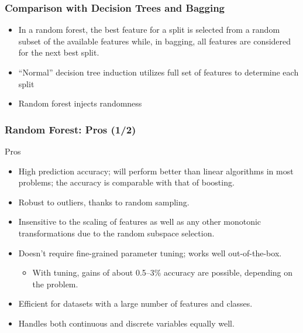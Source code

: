 



\begin{frame}[fragile]\frametitle{Comparison with Decision Trees and Bagging}
\begin{itemize}
\item In a random forest, the best feature for a split is selected from a random subset of the available features while, in bagging, all features are considered for the next best split.
\item ``Normal'' decision tree induction utilizes full set of features to determine each split
\item Random forest injects randomness
\end{itemize}
\end{frame}



\begin{frame}[fragile]\frametitle{Random Forest: Pros (1/2)}
Pros
\begin{itemize}
\item High prediction accuracy; will perform better than linear algorithms in most problems; the accuracy is comparable with that of boosting.
\item Robust to outliers, thanks to random sampling.
\item Insensitive to the scaling of features as well as any other monotonic transformations due to the random subspace selection.
\item Doesn't require fine-grained parameter tuning; works well out-of-the-box.
\begin{itemize}
\item With tuning, gains of about 0.5--3\% accuracy are possible, depending on the problem.
\end{itemize}
\item Efficient for datasets with a large number of features and classes.
\item Handles both continuous and discrete variables equally well.
\end{itemize}
\end{frame}

